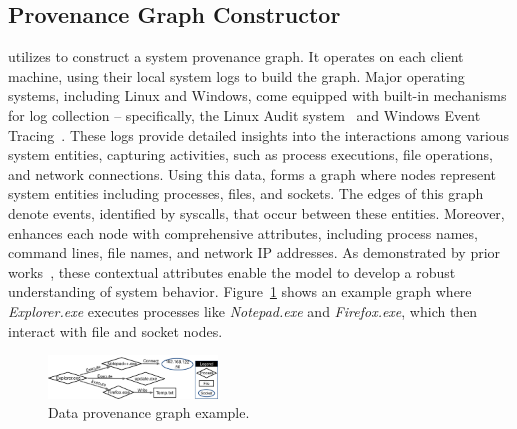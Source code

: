 



\subsection{Provenance Graph Constructor}
\label{sub:provconstruct}

\Sys utilizes \logs to construct a system provenance graph. It operates on each client machine, using their local system logs to build the graph. Major operating systems, including Linux and Windows, come equipped with built-in mechanisms for log collection -- specifically, the Linux Audit system~\cite{linuxaudit} and Windows Event Tracing~\cite{windowsaudit}. These logs provide detailed insights into the interactions among various system entities, capturing activities, such as process executions, file operations, and network connections. Using this data, \Sys forms a graph where nodes represent system entities including processes, files, and sockets. The edges of this graph denote events, identified by syscalls, that occur between these entities. Moreover, \Sys enhances each node with comprehensive attributes, including process names, command lines, file names, and network IP addresses. As demonstrated by prior works~\cite{flash2024,cheng2023kairos}, these contextual attributes enable the model to develop a robust understanding of system behavior. Figure~\ref{provexp} shows an example graph where \textit{Explorer.exe} executes processes like \textit{Notepad.exe} and \textit{Firefox.exe}, which then interact with file and socket nodes.

\begin{figure}[t!]
  \centering
  \includegraphics[width=0.4\textwidth]{fig/provexp.pdf}
  \caption{Data provenance graph example.}
  \label{provexp}
  \vspace{-3ex}
\end{figure}


